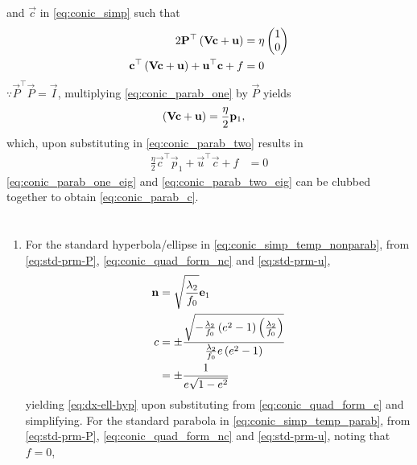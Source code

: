 \documentclass[journal,12pt,onecolumn]{IEEEtran}
\renewcommand\thesection{\arabic{section}}
\begin{document}
\begin{enumerate}[label=\thesection.\arabic*.,ref=\thesection.\theenumi]
and $\vec{c}$ in \eqref{eq:conic_simp} such that
\begin{align}
\label{eq:conic_parab_one}
2\mathbf{P}^{\top}\left(\mathbf{V}\mathbf{c}+\mathbf{u}\right) &= \eta\begin{pmatrix}1\\0\end{pmatrix}
\\
\mathbf{c}^{\top}\left(\mathbf{V}\mathbf{c} + \mathbf{u}\right)+ \mathbf{u}^{\top}\mathbf{c} + f&= 0
\label{eq:conic_parab_two}
\end{align}
$\because
\vec{P}^{\top}\vec{P} = \vec{I}$,
multiplying \eqref{eq:conic_parab_one} by $\vec{P}$ yields
\begin{align}
\label{eq:conic_parab_one_eig}
	\left(\mathbf{V}\mathbf{c}+\mathbf{u}\right) &= \frac{\eta}{2}\mathbf{p}_1,
\end{align}
which, upon substituting in \eqref{eq:conic_parab_two}
results in 
\begin{align}
\frac{\eta}{2}\vec{c}^{\top}\vec{p}_1 + \vec{u}^{\top}\vec{c} + f&= 0
\label{eq:conic_parab_two_eig}
\end{align}
\eqref{eq:conic_parab_one_eig} and \eqref{eq:conic_parab_two_eig} can be clubbed together to obtain \eqref{eq:conic_parab_c}.
  \section{}
  \label{app:foc-dir}
%  
		\begin{enumerate}
			\item For the standard hyperbola/ellipse in \eqref{eq:conic_simp_temp_nonparab}, from 
					\eqref{eq:std-prm-P},
\eqref{eq:conic_quad_form_nc}
and 
					\eqref{eq:std-prm-u},
				\begin{align}
\label{eq:n-ell-hyp}
					\mathbf{n} &= \sqrt{\frac{\lambda_2}{f_0}} \mathbf{e}_1 
					\\
					c &= 
					\pm \frac{\sqrt{-\frac{\lambda_2}{f_0}\left(e^2-1\right)\left(\frac{\lambda_2}{ f_0}\right)}}{\frac{\lambda_2}{f_0}e\left(e^2-1\right)}
					\\
					&=\pm \frac{1}{e\sqrt{1-e^2}}
\label{eq:c-ell-hyp}
				\end{align}
				yielding 
					\eqref{eq:dx-ell-hyp} upon substituting from 
\eqref{eq:conic_quad_form_e} and simplifying.
For the standard parabola in \eqref{eq:conic_simp_temp_parab},  from 
					\eqref{eq:std-prm-P},
\eqref{eq:conic_quad_form_nc}
and 
					\eqref{eq:std-prm-u}, noting that $f = 0$,


\end{enumerate}
\end{enumerate}
\end{document}
